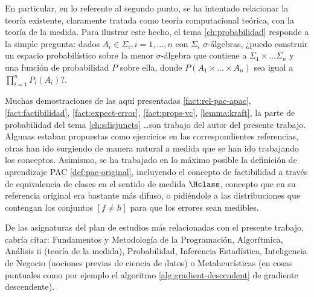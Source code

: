 En particular, en lo referente al segundo punto, se ha intentado relacionar la teoría existente, claramente tratada como 
teoría computacional teórica, con la teoría de la medida. Para ilustrar este hecho, el tema \ref{ch:probabilidad} responde a la 
simple pregunta: dados $A_i \in \Sigma_i, i=1, \ldots, n$ con $\Sigma_i$ $\sigma$-álgebras, ¿puedo construir un espacio probabilístico
sobre la menor $\sigma$-álgebra que contiene a $\Sigma_1 \times \ldots \Sigma_n$ y una función de probabilidad $P$ sobre ella,
donde $P(A_1 \times \ldots \times A_n)$ sea igual a $\prod_{i=1}^n P_i(A_i)$?. 

Muchas demostraciones de las aquí presentadas \ref{fact:rel-pac-apac}, \ref{fact:factibilidad}, \ref{fact:expect-error},
\ref{fact:props-vc}, \ref{lemma:kraft}, la parte de probabilidad del tema \ref{ch:sdisjuncts} \ldots son trabajo del autor del presente
trabajo. Algunas estaban propuestas como ejercicios en las correspondientes referencias, otras han ido surgiendo de manera natural a medida que 
se han ido trabajando los conceptos. Asimismo, se ha trabajado en lo máximo posible la definición de aprendizaje PAC \ref{def:pac-original},
incluyendo el concepto de factibilidad a través de equivalencia de clases en el sentido de medida $\Hclass$, concepto que en su
referencia original era bastante más difuso, o pidiéndole a las distribuciones que contengan los conjuntos $[f\neq h]$ para
que los errores sean medibles.

De las asignaturas del plan de estudios más relacionadas con el presente trabajo, cabría citar: Fundamentos y Metodología
de la Programación, Algorítmica, Análisis ii (teoría de la medida), Probabilidad, Inferencia Estadística, Inteligencia
de Negocio (nociones previas de ciencia de datos) o Metaheurísticas (en cosas puntuales como por ejemplo el algoritmo 
\ref{alg:gradient-descendent} de gradiente descendente).
